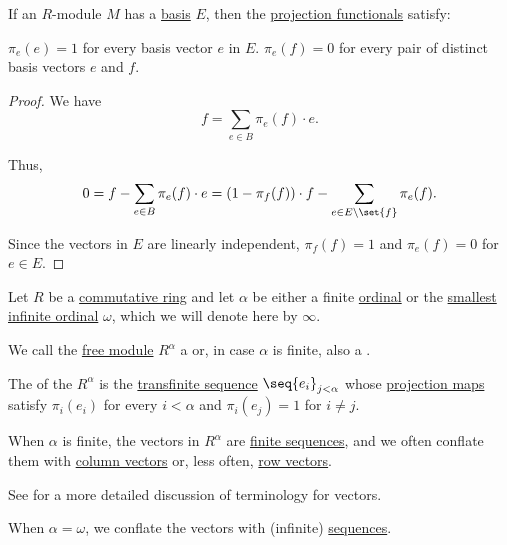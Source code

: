 \begin{proposition}\label{thm:basis_projection_orthonormal}
  If an \( R \)-module \( M \) has a \hyperref[def:hamel_basis]{basis} \( E \), then the \hyperref[def:basis_decomposition]{projection functionals} satisfy:
  \begin{thmenum}
     \( \pi_e(e) = 1 \) for every basis vector \( e \) in \( E \).
     \( \pi_e(f) = 0 \) for every pair of distinct basis vectors \( e \) and \( f \).
  \end{thmenum}
\end{proposition}
\begin{proof}
  We have
  \begin{equation*}
    f = \sum_{e \in B} \pi_e(f) \cdot e.
  \end{equation*}

  Thus,
  \begin{equation*}
    0 = f - \sum_{e \in B} \pi_e(f) \cdot e = (1 - \pi_f(f)) \cdot f - \sum_{e \in E \setminus \set{ f }} \pi_e(f).
  \end{equation*}

  Since the vectors in \( E \) are linearly independent, \( \pi_f(f) = 1 \) and \( \pi_e(f) = 0 \) for \( e \in E \).
\end{proof}

\begin{definition}\label{def:sequence_space}\mimprovised
  Let \( R \) be a \hyperref[def:ring/commutative]{commutative ring} and let \( \alpha \) be either a finite \hyperref[def:ordinal]{ordinal} or the \hyperref[thm:omega_is_an_ordinal]{smallest infinite ordinal} \( \omega \), which we will denote here by \( \infty \).

  We call the \hyperref[def:free_semimodule]{free module} \( R^\alpha \) a  or, in case \( \alpha \) is finite, also a .

  The  of the \( R^\alpha \) is the \hyperref[def:transfinite_sequence]{transfinite sequence} \( \seq{ e_i }_{j < \alpha} \) whose \hyperref[def:basis_decomposition]{projection maps} satisfy \( \pi_i(e_i) \) for every \( i < \alpha \) and \( \pi_i(e_j) = 1 \) for \( i \neq j \).

  When \( \alpha \) is finite, the vectors in \( R^\alpha \) are \hyperref[def:sequence]{finite sequences}, and we often conflate them with \hyperref[def:array/column_vector]{column vectors} or, less often, \hyperref[def:array/row_vector]{row vectors}.
\end{definition}
\begin{comments}
  \item See  for a more detailed discussion of terminology for vectors.
  \item When \( \alpha = \omega \), we conflate the vectors with (infinite) \hyperref[def:sequence]{sequences}.
\end{comments}

